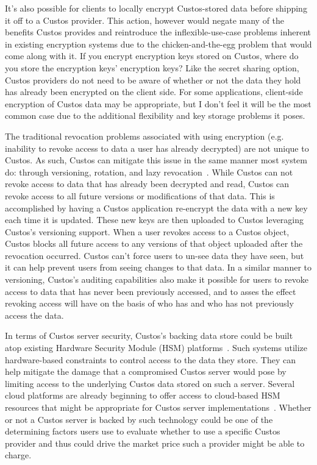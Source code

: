 It's also possible for clients to locally encrypt Custos-stored data
before shipping it off to a Custos provider. This action, however
would negate many of the benefits Custos provides and reintroduce the
inflexible-use-case problems inherent in existing encryption systems
due to the chicken-and-the-egg problem that would come along with
it. If you encrypt encryption keys stored on Custos, where do you
store the encryption keys' encryption keys? Like the secret sharing
option, Custos providers do not need to be aware of whether or not the
data they hold has already been encrypted on the client side. For some
applications, client-side encryption of Custos data may be
appropriate, but I don't feel it will be the most common case due to
the additional flexibility and key storage problems it poses.

The traditional revocation problems associated with using encryption
(e.g. inability to revoke access to data a user has already decrypted)
are not unique to Custos. As such, Custos can mitigate this issue in
the same manner most system do: through versioning, rotation, and lazy
revocation~\cite{Kallahalla2003}. While Custos can not revoke access
to data that has already been decrypted and read, Custos can revoke
access to all future versions or modifications of that data. This is
accomplished by having a Custos application re-encrypt the data with a
new key each time it is updated. These new keys are then uploaded to
Custos leveraging Custos's versioning support. When a user revokes
access to a Custos object, Custos blocks all future access to any
versions of that object uploaded after the revocation occurred. Custos
can't force users to un-see data they have seen, but it can help
prevent users from seeing changes to that data. In a similar manner to
versioning, Custos's auditing capabilities also make it possible for
users to revoke access to data that has never been previously
accessed, and to asses the effect revoking access will have on the
basis of who has and who has not previously access the data.

In terms of Custos server security, Custos's backing data store could
be built atop existing Hardware Security Module (HSM)
platforms~\cite{fips140}. Such systems utilize hardware-based
constraints to control access to the data they store. They can help
mitigate the damage that a compromised Custos server would pose by
limiting access to the underlying Custos data stored on such a
server. Several cloud platforms are already beginning to offer access
to cloud-based HSM resources that might be appropriate for Custos
server implementations~\cite{amazon-hsm}. Whether or not a Custos
server is backed by such technology could be one of the determining
factors users use to evaluate whether to use a specific Custos
provider and thus could drive the market price such a provider might
be able to charge.

